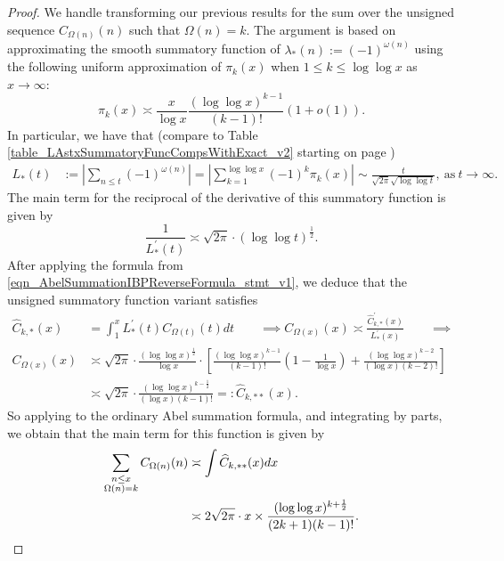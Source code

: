 \documentclass[11pt,reqno,a4letter]{article}
\numberwithin{figure}{section}
\numberwithin{table}{section}
\theoremstyle{plain}
\numberwithin{theorem}{section}
\theoremstyle{definition}
\begin{document}
\begin{proof}
We handle transforming our previous results for the sum over the unsigned sequence 
$C_{\Omega(n)}(n)$ such that $\Omega(n) = k$. 
The argument is based on approximating the smooth summatory function of 
$\lambda_{\ast}(n) := (-1)^{\omega(n)}$ using the following 
uniform approximation of $\pi_k(x)$ when $1 \leq k \leq \log\log x$ as 
$x \rightarrow \infty$: 
\[
\pi_k(x) \asymp \frac{x}{\log x} \frac{(\log\log x)^{k-1}}{(k-1)!} (1 + o(1)). 
\]
In particular, we have that 
(compare to Table \ref{table_LAstxSummatoryFuncCompsWithExact_v2} starting on page 
\pageref{table_LAstxSummatoryFuncCompsWithExact_v2}) 
\begin{align*} 
L_{\ast}(t) & := \left\lvert \sum_{n \leq t} (-1)^{\omega(n)} \right\rvert = 
     \left\lvert \sum_{k=1}^{\log\log x} (-1)^{k} \pi_k(x) \right\rvert \sim 
     \frac{t}{\sqrt{2\pi} \sqrt{\log\log t}}, \mathrm{\ as\ } t \rightarrow \infty. 
\end{align*} 
The main term for the reciprocal of the derivative of this summatory function is given by 
\[
\frac{1}{L_{\ast}^{\prime}(t)} \asymp \sqrt{2\pi} \cdot (\log\log t)^{\frac{1}{2}}. 
\]
After applying the formula from \eqref{eqn_AbelSummationIBPReverseFormula_stmt_v1},  
we deduce that the unsigned summatory function variant satisfies 
\begin{align*} 
\widehat{C}_{k,\ast}(x) & = \int_1^{x} L_{\ast}^{\prime}(t) C_{\Omega(t)}(t) dt \qquad \implies 
C_{\Omega(x)}(x) \asymp \frac{\widehat{C}_{k,\ast}^{\prime}(x)}{L_{\ast}^{\prime}(x)} \qquad \implies \\ 
C_{\Omega(x)}(x) & \asymp \sqrt{2\pi} \cdot \frac{(\log\log x)^{\frac{1}{2}}}{\log x} \cdot  
     \left[\frac{(\log\log x)^{k-1}}{(k-1)!} \left(1 - 
     \frac{1}{\log x}\right) + \frac{(\log\log x)^{k-2}}{(\log x) (k-2)!}\right] \\ 
     & \asymp \sqrt{2\pi} \cdot \frac{(\log\log x)^{k-\frac{1}{2}}}{(\log x) (k-1)!} 
     =: \widehat{C}_{k,\ast\ast}(x). 
\end{align*} 
So applying to the ordinary Abel summation formula, and integrating by parts, we obtain that 
the main term for this function is given by 
\begin{align*} 
\sum_{\substack{n \leq x \\ \Omega(n)=k}} C_{\Omega(n)}(n) & \asymp 
     \int \widehat{C}_{k,\ast\ast}(x)dx \\ 
     & \asymp 2\sqrt{2\pi} \cdot x \times 
     \frac{(\log\log x)^{k+\frac{1}{2}}}{(2k+1)(k-1)!}. 
     \qedhere 
\end{align*} 
\end{proof}
\end{document}
